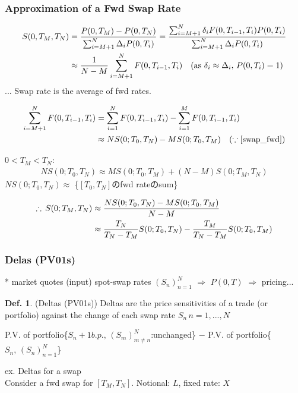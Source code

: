 \documentclass[a4paper,11pt]{jsarticle}
\theoremstyle{definition}
\newtheorem{definition}{Def.}[subsection]
\newcommand{\df}[2]{\dfrac{#1}{#2}}
\begin{document}
\subsubsection{Approximation of a Fwd Swap Rate}
\begin{align}
  S(0,T_M,T_N)&=\df{P(0,T_M)-P(0,T_N)}
  {\sum_{i=M+1}^N \Delta_i P(0,T_i)}
  =\df{\sum_{i=M+1}^N \delta_i F(0,T_{i-1},T_i)P(0,T_i)}
  {\sum_{i=M+1}^N \Delta_i P(0,T_i)} \notag \\
  &\approx \df{1}{N-M} \sum_{i=M+1}^N F(0,T_{i-1},T_i)
  \quad (\mbox{as } \delta_i\approx\Delta_i, \, P(0,T_i)=1)
\end{align}
... Swap rate is the average of fwd rates.

\begin{align}
  \sum_{i=M+1}^N F(0,T_{i-1},T_i)
  &=\sum_{i=1}^N F(0,T_{i-1},T_i)-\sum_{i=1}^M F(0,T_{i-1},T_i) \notag\\
  &\approx NS(0;T_0,T_N) - MS(0;T_0,T_M) \quad
  (\because \ref{swap_fwd})
\end{align}

$0<T_M<T_N$:
\begin{align}
  NS(0;T_0,T_N)\approx MS(0;T_0,T_M)+(N-M)S(0;T_M,T_N)
\end{align}
$NS(0;T_0,T_N)\approx$ \{$[T_0,T_N]$のfwd rateのsum\}

\begin{align}
  \therefore \, S(0;T_M,T_N) &\approx
  \df{NS(0;T_0,T_N)-MS(0;T_0,T_M)}{N-M} \notag \\
  &\approx \df{T_N}{T_N-T_M}S(0;T_0,T_N)
  -\df{T_M}{T_N-T_M}S(0;T_0,T_M)
\end{align}


\subsubsection{Delas (PV01s)}
* market quotes (input) spot-swap rates $(S_n)_{n=1}^N$
$\Rightarrow$ $P(0,T)$ $\Rightarrow$ pricing...

\begin{definition}{(Deltas (PV01s))}
  Deltas are the price sensitivities of a trade (or portfolio)
  against the change of each swap rate $S_n\, n=1,...,N$
\end{definition}

P.V. of portfolio\{$S_n+1b.p.,\, (S_m)_{m\neq n}^N$:unchanged\}
$-$ P.V. of portfolio\{$S_n, \, (S_n)_{n=1}^N$\}

ex. Deltas for a swap \\
Consider a fwd swap for $[T_M,T_N]$. 
Notional: $L$, fixed rate: $X$
\end{document}
